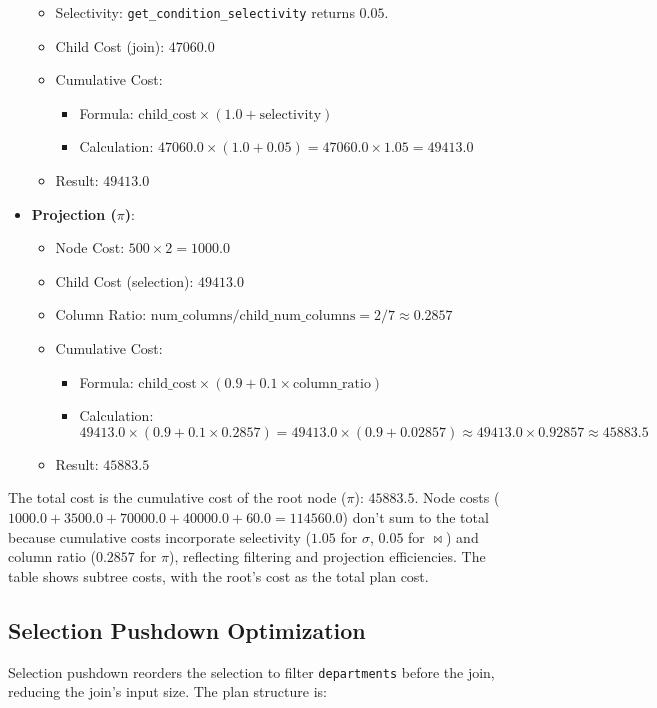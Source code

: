 \documentclass[12pt,a4paper]{article}
\begin{document}
\begin{itemize}
\begin{itemize}
            \item Selectivity: \texttt{get\_condition\_selectivity} returns $0.05$.
            \item Child Cost (join): $47060.0$
            \item Cumulative Cost:
                \begin{itemize}
                    \item Formula: $\text{child\_cost} \times (1.0 + \text{selectivity})$
                    \item Calculation: $47060.0 \times (1.0 + 0.05) = 47060.0 \times 1.05 = 49413.0$
                \end{itemize}
            \item Result: $49413.0$
        \end{itemize}
    \item \textbf{Projection ($\pi$)}:
        \begin{itemize}
            \item Node Cost: $500 \times 2 = 1000.0$
            \item Child Cost (selection): $49413.0$
            \item Column Ratio: $\text{num\_columns} / \text{child\_num\_columns} = 2 / 7 \approx 0.2857$
            \item Cumulative Cost:
                \begin{itemize}
                    \item Formula: $\text{child\_cost} \times (0.9 + 0.1 \times \text{column\_ratio})$
                    \item Calculation: $49413.0 \times (0.9 + 0.1 \times 0.2857) = 49413.0 \times (0.9 + 0.02857) \approx 49413.0 \times 0.92857 \approx 45883.5$
                \end{itemize}
            \item Result: $45883.5$
        \end{itemize}
\end{itemize}

The total cost is the cumulative cost of the root node ($\pi$): $45883.5$. Node costs ($1000.0 + 3500.0 + 70000.0 + 40000.0 + 60.0 = 114560.0$) don’t sum to the total because cumulative costs incorporate selectivity ($1.05$ for $\sigma$, $0.05$ for $\bowtie$) and column ratio ($0.2857$ for $\pi$), reflecting filtering and projection efficiencies. The table shows subtree costs, with the root’s cost as the total plan cost.
\newpage
\subsection{Selection Pushdown Optimization}
Selection pushdown reorders the selection to filter \texttt{departments} before the join, reducing the join’s input size. The plan structure is:
\end{document}
